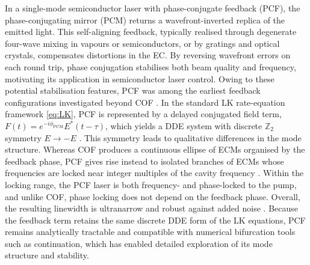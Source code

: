 In a single-mode semiconductor laser with phase-conjugate feedback (PCF), the phase-conjugating mirror (PCM) returns a wavefront-inverted replica of the emitted light. 
This self-aligning feedback, typically realised through degenerate four-wave mixing in vapours or semiconductors, or by gratings and optical crystals, compensates distortions in the EC.
By reversing wavefront errors on each round trip, phase conjugation stabilises both beam quality and frequency, motivating its application in semiconductor laser control.
Owing to these potential stabilisation features, PCF was among the earliest feedback configurations investigated beyond COF \cite{krauskopf1998semiconductor, green2004bifurcation}.
In the standard LK rate-equation framework \eqref{eq:LK}, PCF is represented by a delayed conjugated field term, $F(t) = e^{-i \phi_\text{PCM}} E^*(t-\tau)$, which yields a DDE system with discrete $\mathbb{Z}_2$ symmetry $E \rightarrow -E$ \cite{krauskopf2002routes}.
This symmetry leads to qualitative differences in the mode structure.
Whereas COF produces a continuous ellipse of ECMs organised by the feedback phase, PCF gives rise instead to isolated branches of ECMs whose frequencies are locked near integer multiples of the cavity frequency \cite{erneux2003external}.
Within the locking range, the PCF laser is both frequency- and phase-locked to the pump, and unlike COF, phase locking does not depend on the feedback phase.
Overall, the resulting linewidth is ultranarrow and robust against added noise \cite{green2002global}.
Because the feedback term retains the same discrete DDE form of the LK equations, PCF remains analytically tractable and compatible with numerical bifurcation tools such as continuation, which has enabled detailed exploration of its mode structure and stability.
%
